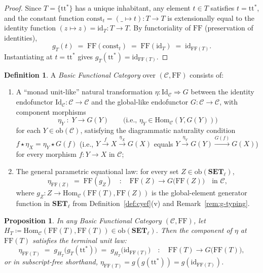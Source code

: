 \documentclass[11pt,a4paper]{article}
\newtheorem{proposition}[theorem]{Proposition}
\theoremstyle{definition}
\newtheorem{definition}[theorem]{Definition}
\theoremstyle{remark}
\newcommand{\Set}{\mathbf{SET}}
\newcommand{\Hom}{\mathrm{Hom}}
\newcommand{\Id}{\mathrm{Id}}
\newcommand{\id}{\mathrm{id}}
\newcommand{\FF}{\mathrm{FF}}
\newcommand{\ttstar}{\mathrm{tt}^*}
\newcommand{\const}{\mathrm{const}}
\begin{document}
\begin{proof}
Since $T = \{\ttstar\}$ has a unique inhabitant, any element $t \in T$ satisfies $t = \ttstar$, and
the constant function $\const_t = (\_ \mapsto t) : T \to T$ is extensionally equal to the identity
function $(z \mapsto z) = \id_T : T \to T$. By functoriality of $\FF$ (preservation of identities),
\[
  g_T(t) \;=\; \FF(\const_t) \;=\; \FF(\id_T) \;=\; \id_{\FF(T)}.
\]
Instantiating at $t = \ttstar$ gives $g_T(\ttstar) = \id_{\FF(T)}$.
\end{proof}

\begin{definition}\label{def:bfc}
A \emph{Basic Functional Category} over $(\mathcal{C}, \FF)$ consists of:
\begin{enumerate}[label=(\roman*),nosep]
  \item A ``monad unit-like'' natural transformation $\eta : \Id_{\mathcal{C}} \Rightarrow G$ between
  the identity endofunctor $\Id_{\mathcal{C}} : \mathcal{C} \to \mathcal{C}$ and the global-like
  endofunctor $G : \mathcal{C} \to \mathcal{C}$, with component morphisms
  \[
    \eta_Y \;:\; Y \longrightarrow G(Y)
    \qquad\bigl(\text{i.e., }\eta_Y \in \Hom_{\mathcal{C}}(Y, G(Y))\bigr)
  \]
  for each $Y \in \mathrm{ob}(\mathcal{C})$, satisfying the diagrammatic naturality condition
  $f \star \eta_X = \eta_Y \star G(f)$ (i.e., $Y \xrightarrow{f} X \xrightarrow{\eta_X} G(X)$ equals
  $Y \xrightarrow{\eta_Y} G(Y) \xrightarrow{G(f)} G(X)$) for every morphism $f : Y \to X$ in $\mathcal{C}$;
\vspace{4 pt}  
  \item The general parametric equational law: for every set $Z \in \mathrm{ob}(\Set_\ell)$,
  \begin{equation}\label{eq:eta-eq}
    \eta_{\FF(Z)} \;=\; \FF(g_Z)
    \quad:\quad
    \FF(Z) \longrightarrow G\bigl(\FF(Z)\bigr)
    \quad\text{in }\mathcal{C},
  \end{equation}
  where $g_Z : Z \to \Hom_{\mathcal{C}}(\FF(T), \FF(Z))$ is the global-element generator function in
  $\Set_\ell$ from Definition~\ref{def:cyef}(v) and Remark~\ref{rem:g-typing}.
\end{enumerate}
\end{definition}

\begin{proposition}\label{prop:eta-eq-T}
In any Basic Functional Category $(\mathcal{C}, \FF)$, let $H_T \coloneqq \Hom_{\mathcal{C}}(\FF(T), \FF(T))
\in \mathrm{ob}(\Set_\ell)$. Then the component of $\eta$ at $\FF(T)$ satisfies the terminal unit law:
\begin{equation}\label{eq:eta-eq-T}
  \eta_{\FF(T)} \;=\; g_{H_T}\bigl(g_T(\ttstar)\bigr) \;=\; g_{H_T}\bigl(\id_{\FF(T)}\bigr)
  \quad:\quad
  \FF(T) \longrightarrow G\bigl(\FF(T)\bigr),
\end{equation}
or in subscript-free shorthand, $\eta_{\FF(T)} = g(g(\ttstar)) = g(\id_{\FF(T)})$.
\end{proposition}
\end{document}
